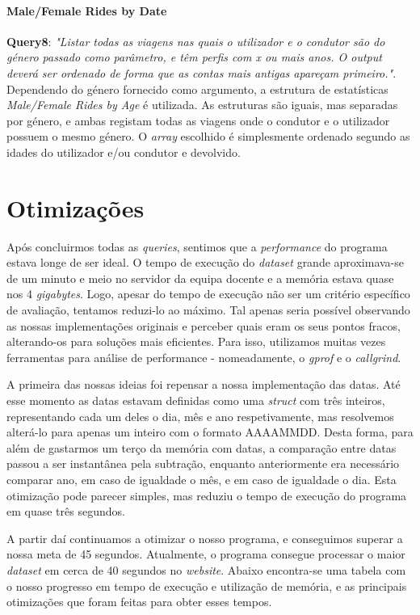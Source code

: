 \documentclass[12pt,a4paper]{report}
\begin{document}
    \subsubsection{Male/Female Rides by Date}
    \par \textbf{Query8}: \textit{"Listar todas as viagens nas quais o utilizador e o condutor são do género passado como parâmetro, e têm perfis com x ou mais anos. O output deverá ser ordenado de forma que as contas mais antigas apareçam primeiro."}. Dependendo do género fornecido como argumento, a estrutura de estatísticas \textit{Male/Female Rides by Age} é utilizada. As estruturas são iguais, mas separadas por género, e ambas registam todas as viagens onde o condutor e o utilizador possuem o mesmo género. O \textit{array} escolhido é simplesmente ordenado segundo as idades do utilizador e/ou condutor e devolvido.

\newpage

    \chapter{Otimizações}
    
    \par Após concluirmos todas as \textit{queries}, sentimos que a \textit{performance} do programa estava longe de ser ideal. O tempo de execução do \textit{dataset} grande aproximava-se de um minuto e meio no servidor da equipa docente e a memória estava quase nos 4 \textit{gigabytes}. Logo, apesar do tempo de execução não ser um critério específico de avaliação, tentamos reduzi-lo ao máximo. Tal apenas seria possível observando as nossas implementações originais e perceber quais eram os seus pontos fracos, alterando-os para soluções mais eficientes. Para isso, utilizamos muitas vezes ferramentas para análise de performance - nomeadamente, o \textit{gprof} e o \textit{callgrind}.
    \par A primeira das nossas ideias foi repensar a nossa implementação das datas. Até esse momento as datas estavam definidas como uma \textit{struct} com três inteiros, representando cada um deles o dia, mês e ano respetivamente, mas resolvemos alterá-lo para apenas um inteiro com o formato AAAAMMDD. Desta forma, para além de gastarmos um terço da memória com datas, a comparação entre datas passou a ser instantânea pela subtração, enquanto anteriormente era necessário comparar ano, em caso de igualdade o mês, e em caso de igualdade o dia. Esta otimização pode parecer simples, mas reduziu o tempo de execução do programa em quase três segundos. 
    \par A partir daí continuamos a otimizar o nosso programa, e conseguimos superar a nossa meta de 45 segundos. Atualmente, o programa consegue processar o maior \textit{dataset} em cerca de 40 segundos no \textit{website}. Abaixo encontra-se uma tabela com o nosso progresso em tempo de execução e utilização de memória, e as principais otimizações que foram feitas para obter esses tempos.
    
\end{document}
